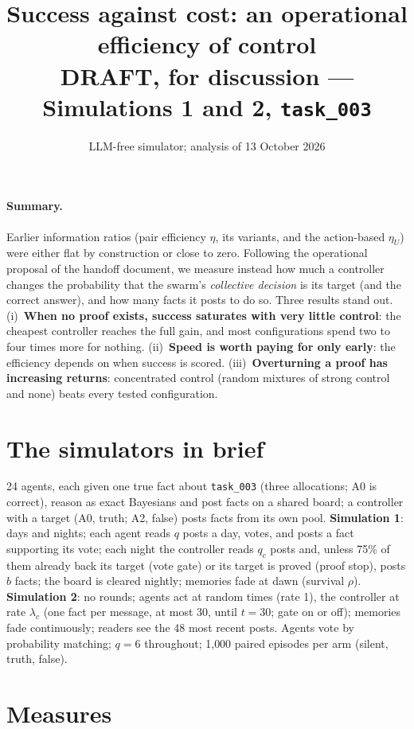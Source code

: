 \documentclass[10pt,a4paper]{article}
\title{\vspace{-1.2cm}\textbf{Success against cost: an operational efficiency of control}\\[2pt]
\large DRAFT, for discussion --- Simulations 1 and 2, \texttt{task\_003}}
\author{LLM-free simulator; analysis of 13 October 2026}
\date{}
\begin{document}
\maketitle
\vspace{-1cm}

\paragraph{Summary.} Earlier information ratios (pair efficiency $\eta$, its variants, and the
action-based $\eta_U$) were either flat by construction or close to zero. Following the
operational proposal of the handoff document, we measure instead how much a controller changes the
probability that the swarm's \emph{collective decision} is its target (and the correct answer), and how
many facts it posts to do so. Three results stand out. (i)~\textbf{When no proof exists, success saturates
with very little control}: the cheapest controller reaches the full gain, and most configurations spend
two to four times more for nothing. (ii)~\textbf{Speed is worth paying for only early}: the efficiency
depends on when success is scored. (iii)~\textbf{Overturning a proof has increasing returns}: concentrated
control (random mixtures of strong control and none) beats every tested configuration.

\section{The simulators in brief}

24 agents, each given one true fact about \texttt{task\_003} (three allocations; A0 is correct), reason as
exact Bayesians and post facts on a shared board; a controller with a target (A0, truth; A2, false) posts
facts from its own pool. \textbf{Simulation 1}: days and nights; each agent reads $q$ posts a day, votes, and
posts a fact supporting its vote; each night the controller reads $q_c$ posts and, unless 75\% of them
already back its target (vote gate) or its target is proved (proof stop), posts $b$ facts; the board is
cleared nightly; memories fade at dawn (survival $\rho$). \textbf{Simulation 2}: no rounds; agents act at
random times (rate 1), the controller at rate $\lambda_c$ (one fact per message, at most 30, until
$t = 30$; gate on or off); memories fade continuously; readers see the 48 most recent posts. Agents
vote by probability matching; $q = 6$ throughout; 1{,}000 paired episodes per arm (silent, truth, false).

\section{Measures}
\end{document}
